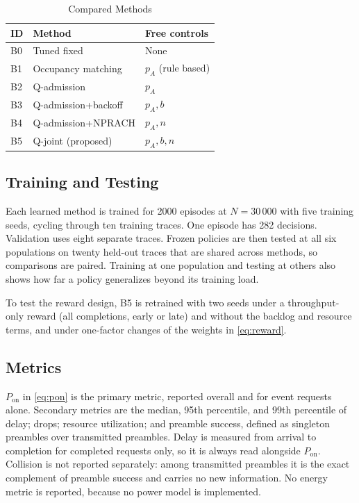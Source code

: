 \documentclass[conference]{IEEEtran}
\begin{document}
\begin{table}[!t]
\caption{Compared Methods}
\label{tab:methods}
\centering
\begin{tabular}{@{}l l l@{}}
\hline
\textbf{ID} & \textbf{Method} & \textbf{Free controls} \\
\hline
B0 & Tuned fixed & None \\
B1 & Occupancy matching & $p_A$ (rule based) \\
B2 & Q-admission & $p_A$ \\
B3 & Q-admission+backoff & $p_A, b$ \\
B4 & Q-admission+NPRACH & $p_A, n$ \\
B5 & Q-joint (proposed) & $p_A, b, n$ \\
\hline
\end{tabular}
\end{table}

\subsection{Training and Testing}
Each learned method is trained for 2000 episodes at $N = 30\,000$ with five training
seeds, cycling through ten training traces. One episode has 282 decisions. Validation
uses eight separate traces. Frozen policies are then tested at all six populations
on twenty held-out traces that are shared across methods, so comparisons are paired.
Training at one population and testing at others also shows how far a policy
generalizes beyond its training load.

To test the reward design, B5 is retrained with two seeds under a throughput-only
reward (all completions, early or late) and without the backlog and resource terms,
and under one-factor changes of the weights in \eqref{eq:reward}.

\subsection{Metrics}
$P_{\mathrm{on}}$ in \eqref{eq:pon} is the primary metric, reported overall and for
event requests alone. Secondary metrics are the median, 95th percentile, and 99th
percentile of delay; drops; resource utilization; and preamble success, defined as
singleton preambles over transmitted preambles. Delay is measured from arrival to
completion for completed requests only, so it is always read alongside
$P_{\mathrm{on}}$. Collision is not reported separately: among transmitted preambles
it is the exact complement of preamble success and carries no new information. No
energy metric is reported, because no power model is implemented.
\end{document}
